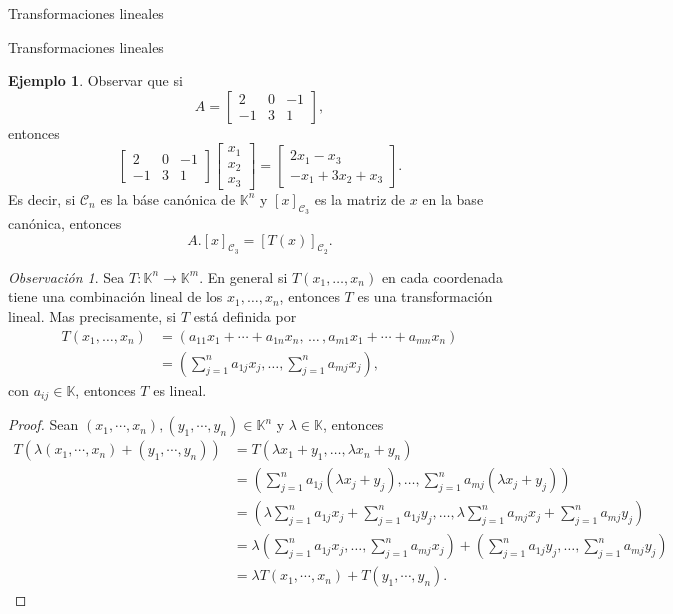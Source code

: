 \documentclass[a4paper,12pt,twoside,spanish,reqno]{amsbook}
\theoremstyle{definition}
\newtheorem{ejemplo}{Ejemplo}[section]
\theoremstyle{remark}
\newtheorem{obs}{Observaci\'on}[section]
\newcommand{\K}{\mathbb K}
\begin{document}
\begin{chapter}{Transformaciones lineales}
\begin{section}{Transformaciones lineales}
\begin{ejemplo}
			Observar que si 
			$$
			 A = \begin{bmatrix}
			 2&0&-1 \\ -1&3&1
			 \end{bmatrix},
			$$
			entonces
			$$
			\begin{bmatrix}
			2&0&-1 \\ -1&3&1
			\end{bmatrix} 
			\begin{bmatrix}
			x_1\\x_2\\x_3
			\end{bmatrix} =
			\begin{bmatrix}
			2x_1 - x_3 \\ -x_1+3x_2+x_3
			\end{bmatrix}.
			$$
			Es decir,  si $\mathcal C_n$  es la báse canónica de $\K^n$ y $[x]_{\mathcal C_3}$ es la matriz de $x$ en la base canónica,  entonces 
			$$
			A.[x]_{\mathcal C_3} = [T(x)]_{\mathcal C_2}.
			$$ 
			\end{ejemplo}
		
			\begin{obs}\label{obs-tl-1.5} 	Sea $T: \K^n \to \K^m$. En  general si $T(x_1,\ldots,x_n)$ en cada coordenada tiene una combinación lineal de los $x_1,\ldots,x_n$,  entonces $T$ es una transformación lineal. Mas precisamente, si $T$ está definida por
				\begin{align*}
				T(x_1,\ldots,x_n) &= (a_{11}x_1+\cdots + a_{1n}x_n,\, \ldots\,,a_{m1}x_1+\cdots + a_{mn}x_n )\\
				&=(\sum_{j=1}^n a_{1j} x_j,\ldots,\sum_{j=1}^n a_{mj} x_j),
				\end{align*}
				con $a_{ij} \in \K$, entonces $T$  es lineal. 
			\begin{proof}
				Sean $(x_1,\cdots,x_n), (y_1,\cdots,y_n) \in \K^n$ y $\lambda \in \K$,  entonces
				\begin{align*}
				T(\lambda(x_1,\cdots,x_n)+ (y_1,\cdots,y_n)) &= T(\lambda x_1+y_1,\ldots,\lambda x_n+y_n) \\
				&= (\sum_{j=1}^n a_{1j} (\lambda x_j+y_j),\ldots,\sum_{j=1}^n a_{mj} (\lambda x_j+y_j)) \\
				&= (\lambda\sum_{j=1}^n a_{1j} x_j+\sum_{j=1}^n a_{1j} y_j,\ldots,\lambda\sum_{j=1}^n a_{mj} x_j+\sum_{j=1}^n a_{mj} y_j) \\
				&= \lambda(\sum_{j=1}^n a_{1j} x_j,\ldots,\sum_{j=1}^n a_{mj} x_j) +(\sum_{j=1}^n a_{1j} y_j,\ldots,\sum_{j=1}^n a_{mj} y_j) \\
				& =\lambda T(x_1,\cdots,x_n)+ T(y_1,\cdots,y_n).
				\end{align*}
			\end{proof}
			\end{obs}
			

\end{section}
\end{chapter}
\end{document}
